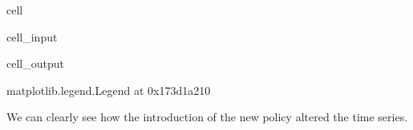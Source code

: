 \documentclass[letterpaper,10pt,english]{jupyterBook}
\begin{document}
\begin{sphinxuseclass}{cell}\begin{sphinxVerbatimInput}

\begin{sphinxuseclass}{cell_input}
\begin{sphinxVerbatim}[commandchars=\\\{\}]
   \PYG{p}{[}\PYG{p}{]}
     \PYG{p}{[} \PYG{p}{]} 
   
\end{sphinxVerbatim}

\end{sphinxuseclass}\end{sphinxVerbatimInput}
\begin{sphinxVerbatimOutput}

\begin{sphinxuseclass}{cell_output}
\begin{sphinxVerbatim}[commandchars=\\\{\}]
\PYGZlt{}matplotlib.legend.Legend at 0x173d1a210\PYGZgt{}
\end{sphinxVerbatim}

\noindent{}

\end{sphinxuseclass}\end{sphinxVerbatimOutput}

\end{sphinxuseclass}
\sphinxAtStartPar
We can clearly see how the introduction of the new policy altered the time series.
\end{document}
